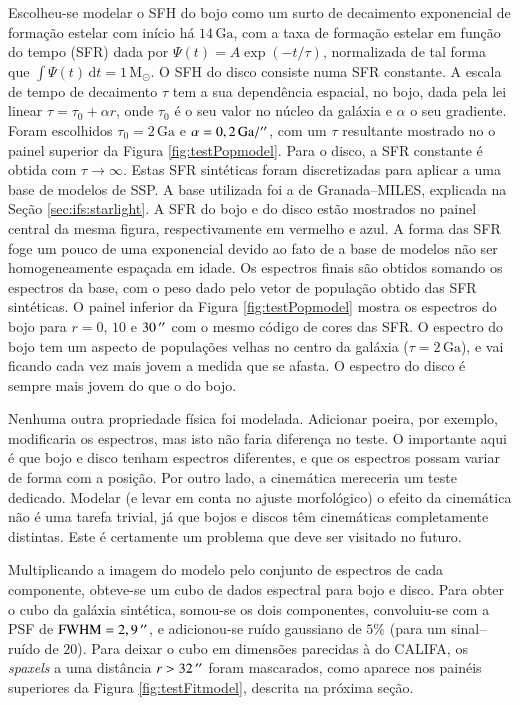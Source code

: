 Escolheu-se modelar o SFH do bojo como um surto de decaimento exponencial de
formação estelar com início há $14\,\mathrm{Ga}$, com a taxa de formação estelar
em função do tempo (SFR) dada por $\Psi(t) = A \exp (-t/\tau)$, normalizada de
tal forma que $\int \Psi(t)\,\mathrm{d}t = 1\,\mathrm{M}_\odot$. O SFH do disco
consiste numa SFR constante. A escala de tempo de decaimento $\tau$ tem a sua
dependência espacial, no bojo, dada pela lei linear $\tau = \tau_0 + \alpha r$,
onde $\tau_0$ é o seu valor no núcleo da galáxia e $\alpha$ o seu gradiente.
Foram escolhidos $\tau_0 = 2\,\mathrm{Ga}$ e $\alpha = 0,2\,\mathrm{Ga} /
^{\prime\prime}$, com um $\tau$ resultante mostrado no o painel superior da Figura
\ref{fig:testPopmodel}. Para o disco, a SFR constante é obtida com
$\tau\to\infty$. Estas SFR sintéticas foram discretizadas para aplicar a uma
base de modelos de SSP. A base utilizada foi a de Granada--MILES, explicada na
Seção \ref{sec:ifs:starlight}. A SFR do bojo e do disco estão mostrados no
painel central da mesma figura, respectivamente em vermelho e azul. A forma das
SFR foge um pouco de uma exponencial devido ao fato de a base de modelos não ser
homogeneamente espaçada em idade. Os espectros finais são obtidos somando os
espectros da base, com o peso dado pelo vetor de população obtido das SFR
sintéticas. O painel inferior da Figura \ref{fig:testPopmodel} mostra os
espectros do bojo para $r = 0$, $10$ e $30\,^{\prime\prime}$ com o mesmo código de cores
das SFR. O espectro do bojo tem um aspecto de populações velhas no centro da
galáxia ($\tau = 2\,\mathrm{Ga}$), e vai ficando cada vez mais jovem a medida
que se afasta. O espectro do disco é sempre mais jovem do que o do bojo.

Nenhuma outra propriedade física foi modelada. Adicionar poeira, por exemplo,
modificaria os espectros, mas isto não faria diferença no teste. O importante
aqui é que bojo e disco tenham espectros diferentes, e que os espectros possam
variar de forma com a posição. Por outro lado, a cinemática mereceria um teste
dedicado. Modelar (e levar em conta no ajuste morfológico) o efeito da
cinemática não é uma tarefa trivial, já que bojos e discos têm cinemáticas
completamente distintas. Este é certamente um problema que deve ser visitado no
futuro.

Multiplicando a imagem do modelo pelo conjunto de espectros de cada componente,
obteve-se um cubo de dados espectral para bojo e disco. Para obter o cubo da
galáxia sintética, somou-se os dois componentes, convoluiu-se com a PSF de
$\mathrm{FWHM} = 2,9\,^{\prime\prime}$, e adicionou-se ruído gaussiano de $5\%$ (para um
sinal--ruído de $20$). Para deixar o cubo em dimensões parecidas à do CALIFA, os
{\em spaxels} a uma distância $r > 32\,^{\prime\prime}$ foram mascarados, como aparece nos
painéis superiores da Figura \ref{fig:testFitmodel}, descrita na próxima seção.

